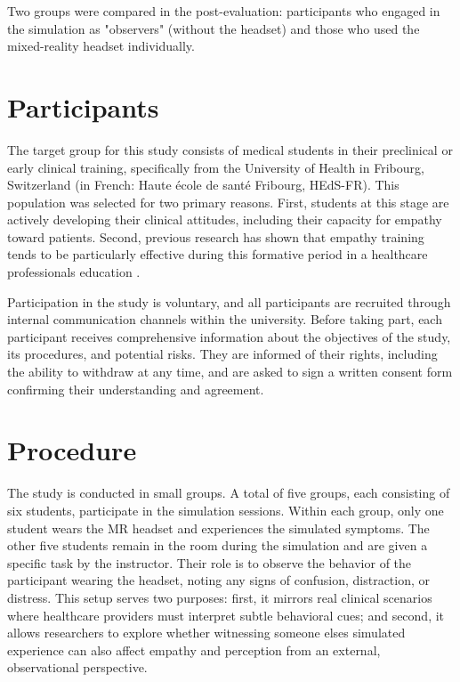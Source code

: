 Two groups were compared in the post-evaluation: participants who engaged in the simulation as "observers" (without the headset) and those who used the mixed-reality headset individually.

\section{Participants}

The target group for this study consists of medical students in their preclinical or early clinical training, specifically from the University of Health in Fribourg, Switzerland (in French: Haute école de santé Fribourg, HEdS-FR). This population was selected for two primary reasons. First, students at this stage are actively developing their clinical attitudes, including their capacity for empathy toward patients. Second, previous research has shown that empathy training tends to be particularly effective during this formative period in a healthcare professionals education \cite{Hsia2022, Kuhail2022}.

Participation in the study is voluntary, and all participants are recruited through internal communication channels within the university. Before taking part, each participant receives comprehensive information about the objectives of the study, its procedures, and potential risks. They are informed of their rights, including the ability to withdraw at any time, and are asked to sign a written consent form confirming their understanding and agreement.


\section{Procedure}

The study is conducted in small groups. A total of five groups, each consisting of six students, participate in the simulation sessions. Within each group, only one student wears the MR headset and experiences the simulated symptoms. The other five students remain in the room during the simulation and are given a specific task by the instructor. Their role is to observe the behavior of the participant wearing the headset, noting any signs of confusion, distraction, or distress. This setup serves two purposes: first, it mirrors real clinical scenarios where healthcare providers must interpret subtle behavioral cues; and second, it allows researchers to explore whether witnessing someone elses simulated experience can also affect empathy and perception from an external, observational perspective.

